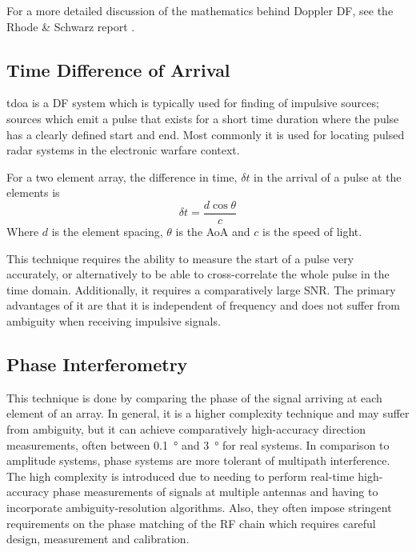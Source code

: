 For a more detailed discussion of the mathematics behind Doppler DF, see the Rhode \& Schwarz report \cite{rhode2000introtodf}. 

\subsection{Time Difference of Arrival}
\gls{tdoa} is a DF system which is typically used for finding of impulsive sources; sources which emit a pulse that exists for a short time duration where the pulse has a clearly defined start and end. Most commonly it is used for locating pulsed radar systems in the electronic warfare context.

For a two element array, the difference in time, \(\delta t\) in the arrival of a pulse at the elements is
\begin{equation}
  \delta t = \frac{d \cos \theta}{c}
\end{equation}
Where \(d\) is the element spacing, \(\theta\) is the AoA and \(c\) is the speed of light.

This technique requires the ability to measure the start of a pulse very accurately, or alternatively to be able to cross-correlate the whole pulse in the time domain. Additionally, it requires a comparatively large SNR. The primary advantages of it are that it is independent of frequency and does not suffer from ambiguity when receiving impulsive signals\cite{jenkins1991smallaperture}.

\subsection{Phase Interferometry}
This technique is done by comparing the phase of the signal arriving at each element of an array.
In general, it is a higher complexity technique and may suffer from ambiguity, but it can achieve comparatively high-accuracy direction measurements, often between \SI{0.1}{\degree} and \SI{3}{\degree} for real systems\cite{center2012electronic}.
In comparison to amplitude systems, phase systems are more tolerant of multipath interference. 
The high complexity is introduced due to needing to perform real-time high-accuracy phase measurements of signals at multiple antennas and having to incorporate ambiguity-resolution algorithms.
Also, they often impose stringent requirements on the phase matching of the RF chain which requires careful design, measurement and calibration\cite{schleher1999electronic}.

